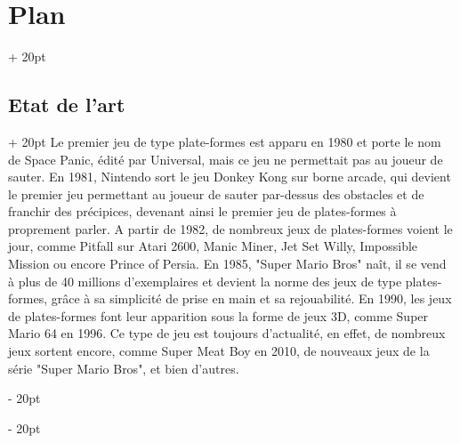 \documentclass[a4paper, 12pt, twoside]{article}
\newcommand{\ind}[1][20pt]{\advance\leftskip + #1}
\newcommand{\deind}[1][20pt]{\advance\leftskip - #1}
\newenvironment{indt}[2][20pt]{#2 \par \ind[#1]}{\par \deind} %
\begin{document}
\begin{indt}{\section{Plan}}
        \begin{indt}{\subsection{Etat de l'art}}
            Le premier jeu de type plate-formes est apparu en 1980 et porte le nom de Space Panic, édité par Universal, mais ce jeu ne permettait pas au joueur de sauter. En 1981, Nintendo sort le jeu Donkey Kong sur borne arcade, qui devient le premier jeu permettant au joueur de sauter par-dessus des obstacles et de franchir des précipices, devenant ainsi le premier jeu de plates-formes à proprement parler. A partir de 1982, de nombreux jeux de plates-formes voient le jour, comme Pitfall sur Atari 2600, Manic Miner, Jet Set Willy, Impossible Mission ou encore Prince of Persia. En 1985, "Super Mario Bros" naît, il se vend à plus de 40 millions d'exemplaires et devient la norme des jeux de type plates-formes, grâce à sa simplicité de prise en main et sa rejouabilité. En 1990, les jeux de plates-formes font leur apparition sous la forme de jeux 3D, comme Super Mario 64 en 1996. Ce type de jeu est toujours d'actualité, en effet, de nombreux jeux sortent encore, comme Super Meat Boy en 2010, de nouveaux jeux de la série "Super Mario Bros", et bien d'autres.
        \end{indt}

        \newpage
        

\end{indt}
\end{document}
